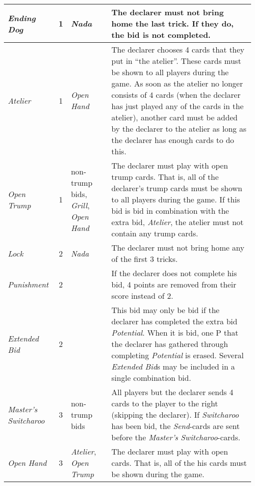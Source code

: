\begin{table}
\begin{center}
{\begin{tabularx}{\textwidth}{ lcX | p{6cm} }
					\textit{Ending Dog} & 1 &
					\textit{Nada} &
					The declarer must not bring home the last trick. If they do, the bid is not completed.
					\\ \hline
					
					\textit{Atelier} & 1 &
					\textit{Open Hand} &
					The declarer chooses 4 cards that they put in ``the atelier''. These cards must be shown to all players during the game. As soon as the atelier no longer consists of 4 cards (when the declarer has just played any of the cards in the atelier), another card must be added by the declarer to the atelier as long as the declarer has enough cards to do this.
					\\ \hline
					
					\textit{Open Trump} & 1 &
					non-trump bids, \newline \textit{Grill}, \newline \textit{Open Hand} &
					The declarer must play with open trump cards. That is, all of the declarer’s trump cards must be shown to all players during the game. If this bid is bid in combination with the extra bid, \emph{Atelier}, the atelier must not contain any trump cards.
					\\ \hline
					
					\textit{Lock} & 2 &
					\textit{Nada} &
					The declarer must not bring home any of the first 3 tricks.
					\\ \hline
					
					\textit{Punishment} & 2 &
					&
					If the declarer does not complete his bid, 4 points are removed from their score instead of 2.
					\\ \hline
					
					\textit{Extended Bid} & 2 &
					&
					This bid may only be bid if the declarer has completed the extra bid \emph{Potential}. When it is bid, one P that the declarer has gathered through completing \emph{Potential} is erased. Several \emph{Extended Bid}s may be included in a single combination bid.
					\\ \hline
					
					\textit{Master's Switcharoo} & 3 &
					non-trump bids &
					All players but the declarer sends 4 cards to the player to the right (skipping the declarer). If \emph{Switcharoo} has been bid, the \emph{Send}-cards are sent before the \emph{Master's Switcharoo}-cards.
					\\ \hline
					
					\textit{Open Hand} & 3 &
					\textit{Atelier}, \newline \textit{Open Trump} &
					The declarer must play with open cards. That is, all of the his cards must be shown during the game.
					\\ \hline
					

\end{tabularx}}
\end{center}
\end{table}
